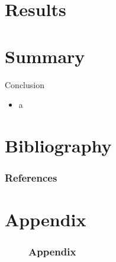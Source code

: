 \documentclass[aspectratio=169]{beamer}
\begin{document}
  \section{Results}

  \section{Summary}

    \begin{frame}{Conclusion}
      \begin{itemize}
        \item a
      \end{itemize}
    \end{frame}

  \section{Bibliography}

    \begin{frame}[allowframebreaks]
      \frametitle{References}
      
    \end{frame}

  \section{Appendix}

    \begin{figure}[allowframebreaks]
      \frametitle{Appendix}
    \end{figure}
\end{document}
